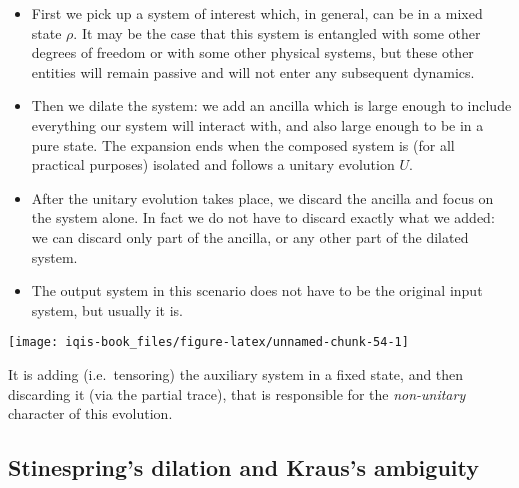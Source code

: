 \documentclass[fleqn]{article}
\providecommand{\tightlist}{%
  \setlength{\itemsep}{0pt}\setlength{\parskip}{0pt}}
\begin{document}
\begin{itemize}
\tightlist
\item
  First we pick up a system of interest which, in general, can be in a mixed state \(\rho\). It may be the case that this system is entangled with some other degrees of freedom or with some other physical systems, but these other entities will remain passive and will not enter any subsequent dynamics.
\item
  Then we dilate the system: we add an ancilla which is large enough to include everything our system will interact with, and also large enough to be in a pure state. The expansion ends when the composed system is (for all practical purposes) isolated and follows a unitary evolution \(U\).
\item
  After the unitary evolution takes place, we discard the ancilla and focus on the system alone. In fact we do not have to discard exactly what we added: we can discard only part of the ancilla, or any other part of the dilated system.
\item
  The output system in this scenario does not have to be the original input system, but usually it is.
\end{itemize}

\begin{center}\texttt{[image: iqis-book\_files/figure-latex/unnamed-chunk-54-1]} \end{center}

It is adding (i.e.~tensoring) the auxiliary system in a fixed state, and then discarding it (via the partial trace), that is responsible for the \emph{non-unitary} character of this evolution.

\hypertarget{stinesprings-dilation-and-krauss-ambiguity}{%
\subsection{Stinespring's dilation and Kraus's ambiguity}\label{stinesprings-dilation-and-krauss-ambiguity}}
\end{document}
